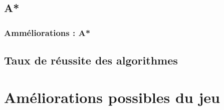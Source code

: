 \documentclass{article}
\begin{document}
\subsection{A*}
\subsubsection{Amméliorations : A*}
\subsection{Taux de réussite des algorithmes}
\section{Améliorations possibles du jeu}
\end{document}
